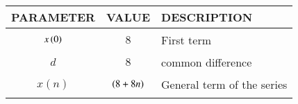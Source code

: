 \begin{tabular}{|p{2cm}|p{2.5cm}|p{2.3cm}|}
    \hline
    PARAMETER & VALUE & DESCRIPTION  \\ \hline
    $$x\left(0\right)$$ & $$8$$ & First term \\ \hline
    $$d$$ & $$8$$ & common difference \\ \hline
    $$x(n)$$ & $$\left(8+8n\right)$$ & General term of the series  \\ 
    \hline
\end{tabular}
